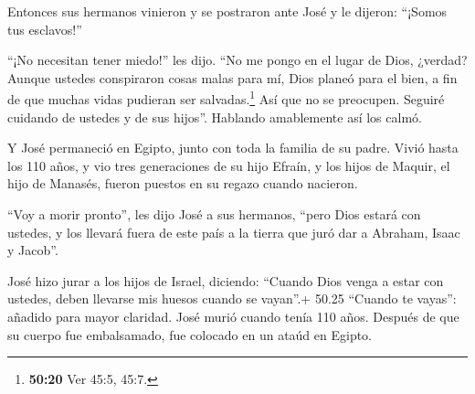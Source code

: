  Entonces sus hermanos vinieron y se postraron ante José y
le dijeron: ``¡Somos tus esclavos!''

 ``¡No necesitan tener miedo!'' les dijo. ``No me pongo en
el lugar de Dios, ¿verdad?  Aunque ustedes conspiraron
cosas malas para mí, Dios planeó para el bien, a fin de que muchas vidas
pudieran ser salvadas.\footnote{\textbf{50:20} Ver 45:5, 45:7.}
 Así que no se preocupen. Seguiré cuidando de ustedes y de
sus hijos''. Hablando amablemente así los calmó.

 Y José permaneció en Egipto, junto con toda la familia de
su padre. Vivió hasta los 110 años,  y vio tres
generaciones de su hijo Efraín, y los hijos de Maquir, el hijo de
Manasés, fueron puestos en su regazo cuando nacieron.

 ``Voy a morir pronto'', les dijo José a sus hermanos,
``pero Dios estará con ustedes, y los llevará fuera de este país a la
tierra que juró dar a Abraham, Isaac y Jacob''.

 José hizo jurar a los hijos de Israel, diciendo: ``Cuando
Dios venga a estar con ustedes, deben llevarse mis huesos cuando se
vayan''.+ 50.25 ``Cuando te vayas'': añadido para mayor claridad.
 José murió cuando tenía 110 años. Después de que su cuerpo
fue embalsamado, fue colocado en un ataúd en Egipto.
